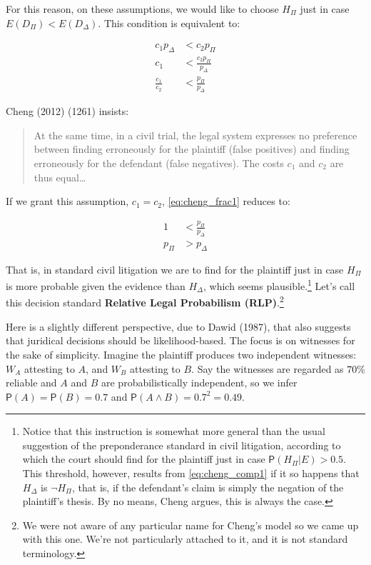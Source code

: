 \documentclass[10pt,dvipsnames,enabledeprecatedfontcommands]{scrartcl}
\newcommand{\n}{\neg}
\newcommand{\et}{\wedge}
\newcommand{\pr}[1]{\mathsf{P}(#1)}
\begin{document}
\noindent For this reason, on these assumptions, we would like to choose
\(H_\Pi\) just in case \(E(D_\Pi) < E(D_\Delta)\). This condition is
equivalent to:

\vspace{-6mm}

\begin{align}
\nonumber c_1p_\Delta &< c_2p_\Pi \\
\nonumber c_1 & < \frac{c_2p_\Pi}{p_\Delta}\\
\label{eq:cheng_frac1}\frac{c_1}{c_2} & < \frac{p_\Pi}{p_\Delta}
\end{align}

\noindent Cheng (2012) (1261) insists:

\begin{quote}
At the same time, in a civil trial, the legal system expresses no preference between finding erroneously for the plaintiff (false positives) and finding erroneously for the defendant (false negatives). The costs $c_1$ and $c_2$ are thus equal\dots
\end{quote}

\noindent If we grant this assumption, \(c_1=c_2\),
\eqref{eq:cheng_frac1} reduces to:

\vspace{-6mm}

\begin{align}
\nonumber 1 &< \frac{p_\Pi}{p_\Delta} \\
\label{eq:cheng_comp1} p_\Pi &> p_\Delta 
\end{align}

\noindent That is, in standard civil litigation we are to find for the
plaintiff just in case \(H_\Pi\) is more probable given the evidence
than \(H_\Delta\), which seems
plausible.\footnote{Notice that this instruction is somewhat more general than the usual suggestion of the preponderance standard in civil litigation,  according to which the court should find for the plaintiff just in case $\pr{H_\Pi\vert E} >0.5$. This threshold, however, results from \eqref{eq:cheng_comp1} if it so happens that $H_\Delta$ is $\n H_\Pi$, that is, if the defendant's claim is simply the negation of the plaintiff's thesis.  By no means, Cheng argues, this is always the case.}
Let's call this decision standard
\textbf{Relative Legal Probabilism (RLP)}.\footnote{We were not aware of any particular name for Cheng's model so we came up with this one. We're not particularly attached to it, and it is not standard terminology.}

Here is a slightly different perspective, due to Dawid (1987), that also
suggests that juridical decisions should be likelihood-based. The focus
is on witnesses for the sake of simplicity. Imagine the plaintiff
produces two independent witnesses: \(W_A\) attesting to \(A\), and
\(W_B\) attesting to \(B\). Say the witnesses are regarded as \(70\%\)
reliable and \(A\) and \(B\) are probabilistically independent, so we
infer \(\pr{A}=\pr{B}=0.7\) and \(\pr{A\et B}=0.7^2=0.49\).
\end{document}
